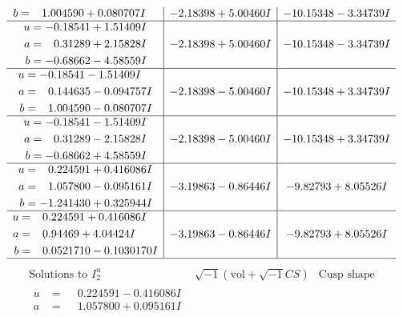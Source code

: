 \documentclass[1p]{elsarticle_modified}
\theoremstyle{definition}
\newcommand{\I}{\sqrt{-1}}
\begin{document}
$$\begin{array}{c|c|c}
\begin{aligned}
b &= \phantom{-}1.004590 + 0.080707 I\end{aligned}
 & -2.18398 + 5.00460 I & -10.15348 - 3.34739 I \\ \hline\begin{aligned}
u &= -0.18541 + 1.51409 I \\
a &= \phantom{-}0.31289 + 2.15828 I \\
b &= -0.68662 - 4.58559 I\end{aligned}
 & -2.18398 + 5.00460 I & -10.15348 - 3.34739 I \\ \hline\begin{aligned}
u &= -0.18541 - 1.51409 I \\
a &= \phantom{-}0.144635 - 0.094757 I \\
b &= \phantom{-}1.004590 - 0.080707 I\end{aligned}
 & -2.18398 - 5.00460 I & -10.15348 + 3.34739 I \\ \hline\begin{aligned}
u &= -0.18541 - 1.51409 I \\
a &= \phantom{-}0.31289 - 2.15828 I \\
b &= -0.68662 + 4.58559 I\end{aligned}
 & -2.18398 - 5.00460 I & -10.15348 + 3.34739 I \\ \hline\begin{aligned}
u &= \phantom{-}0.224591 + 0.416086 I \\
a &= \phantom{-}1.057800 - 0.095161 I \\
b &= -1.241430 + 0.325944 I\end{aligned}
 & -3.19863 - 0.86446 I & -9.82793 + 8.05526 I \\ \hline\begin{aligned}
u &= \phantom{-}0.224591 + 0.416086 I \\
a &= \phantom{-}0.94469 + 4.04424 I \\
b &= \phantom{-}0.0521710 - 0.1030170 I\end{aligned}
 & -3.19863 - 0.86446 I & -9.82793 + 8.05526 I\\
 \hline 
 \end{array}$$\newpage$$\begin{array}{c|c|c}  
\text{Solutions to }I^u_{2}& \I (\text{vol} + \sqrt{-1}CS) & \text{Cusp shape}\\
 \hline 
\begin{aligned}
u &= \phantom{-}0.224591 - 0.416086 I \\
a &= \phantom{-}1.057800 + 0.095161 I \\

\end{aligned}
\end{array}$$
\end{document}
